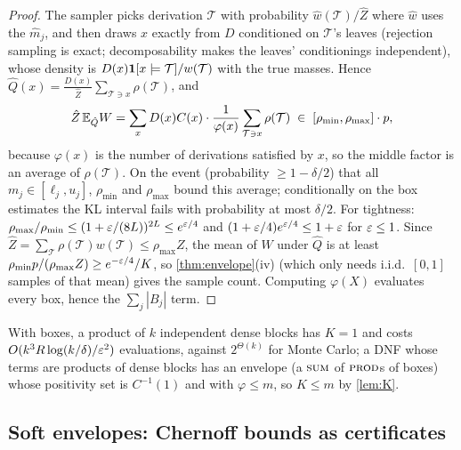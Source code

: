 \begin{proof}
The sampler picks derivation $\mathcal T$ with probability
$\hat w(\mathcal T)/\hat Z$ where $\hat w$ uses the $\hat m_j$, and then draws
$x$ exactly from $D$ conditioned on $\mathcal T$'s leaves (rejection sampling
is exact; decomposability makes the leaves' conditionings independent), whose
density is $D(x)\mathbf{1}[x\models\mathcal T]/w(\mathcal T)$ with the true masses.
Hence $\hat Q(x)=\frac{D(x)}{\hat Z}\sum_{\mathcal T\ni x}\rho(\mathcal T)$, and
\[
\hat Z\,\mathbb{E}_{\hat Q}W=\sum_xD(x)C(x)\cdot\frac{1}{\varphi(x)}\sum_{\mathcal
T\ni x}\rho(\mathcal T)\;\in\;[\rho_{\min},\rho_{\max}]\cdot p,
\]
because $\varphi(x)$ is the number of derivations satisfied by $x$, so the
middle factor is an average of $\rho(\mathcal T)$. On the event (probability
$\ge1-\delta/2$) that all $m_j\in[\ell_j,u_j]$, $\rho_{\min}$ and $\rho_{\max}$
bound this average; conditionally on the box estimates the KL interval fails
with probability at most $\delta/2$. For tightness: $\rho_{\max}/\rho_{\min}\le
(1+\varepsilon/(8L))^{2L}\le e^{\varepsilon/4}$ and $(1+\varepsilon/4)e^{\varepsilon/4}\le1+\varepsilon$ for $\varepsilon\le1$.
Since $\hat Z=\sum_{\mathcal T}\rho(\mathcal T)w(\mathcal T)\le\rho_{\max}Z$, the mean
of $W$ under $\hat Q$ is at least $\rho_{\min}p/(\rho_{\max}Z)\ge e^{-\varepsilon/4}/K$, so
\cref{thm:envelope}(iv) (which only needs i.i.d.\ $[0,1]$ samples of that mean)
gives the sample count. Computing $\varphi(X)$ evaluates every box, hence the
$\sum_j|B_j|$ term.
\end{proof}

With boxes, a product of $k$ independent dense blocks has $K=1$ and costs
$O(k^3R\log(k/\delta)/\varepsilon^2)$ evaluations, against $2^{\Theta(k)}$ for Monte
Carlo; a DNF whose terms are products of dense blocks has an envelope (a $\textsc{sum}$ of
$\textsc{prod}$s of boxes) whose positivity set is $C^{-1}(1)$ and with $\varphi\le m$, so
$K\le m$ by \cref{lem:K}.

\subsection{Soft envelopes: Chernoff bounds as certificates}\label{sec:tilting}

